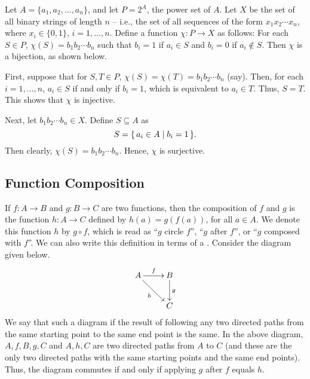 \begin{Example}
Let $A = \{a_1, a_2, \ldots, a_n\}$, and let $P = 2^A$, the power set of $A$. Let $X$ be the set of all binary strings of length $n$ -- i.e., the set of all sequences of the form $x_1 x_2 \cdots x_n$, where $x_i \in \{0, 1\}$, $i = 1, \ldots, n$. Define a function $\chi \colon P \to X$ as follows: For each $S \in P$, $\chi(S) = b_1 b_2 \cdots b_n$ such that $b_i = 1$ if $a_i \in S$ and $b_i = 0$ if $a_i \notin S$. Then $\chi$ is a bijection, as shown below.

First, suppose that for $S, T \in P$, $\chi(S) = \chi(T) = b_1 b_2 \cdots b_n$ (say). Then, for each $i = 1, \ldots, n$, $a_i \in S$ if and only if $b_i = 1$, which is equivalent to $a_i \in T$. Thus, $S = T$. This shows that $\chi$ is injective.

Next, let $b_1 b_2 \cdots b_n \in X$. Define $S \subseteq A$ as
\begin{equation*}
S = \qty{\, a_i \in A \mid b_i = 1 \,}.
\end{equation*}
Then clearly, $\chi(S) = b_1 b_2 \cdots b_n$. Hence, $\chi$ is surjective.
\end{Example}

\subsection{Function Composition}\label{subsec:FuncComp}

If $f \colon A \to B$ and $g \colon B \to C$ are two functions, then the composition of $f$ and $g$ is the function $h \colon A \to C$ defined by $h(a) = g(f(a))$, for all $a \in A$. We denote this function $h$ by $g \circ f$, which is read as ``$g$ circle $f$'', ``$g$ after $f$'', or ``$g$ composed with $f$''. We can also write this definition in terms of a . Consider the diagram given below.
\begin{equation*}
\xymatrix{
    A \ar[r]^f \ar[rd]_h & B \ar[d]^g \\
    & C
}
\end{equation*}
We say that such a diagram  if the result of following any two directed paths from the same starting point to the same end point is the same. In the above diagram, $A, f, B, g, C$ and $A, h, C$ are two directed paths from $A$ to $C$ (and these are the only two directed paths with the same starting points and the same end points). Thus, the diagram commutes if and only if applying $g$ after $f$ equals $h$.

